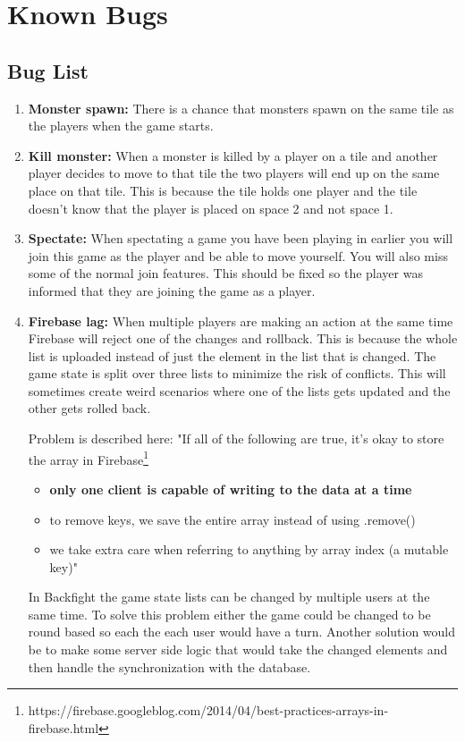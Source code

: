 \pagestyle{Uni}

\chapter{Known Bugs}

\section{Bug List}

\begin{enumerate}
	\item \textbf{Monster spawn:} There is a chance that monsters spawn on the same tile as the players when the game starts.
	
	\item \textbf{Kill monster:} When a monster is killed by a player on a tile and another player decides to move to that tile the two players will end up on the same place on that tile. This is because the tile holds one player and the tile doesn't know that the player is placed on space 2 and not space 1.
		
	\item \textbf{Spectate:} When spectating a game you have been playing in earlier you will join this game as the player and be able to move yourself. You will also miss some of the normal join features. This should be fixed so the player was informed that they are joining the game as a player.

	\item \textbf{Firebase lag:} When multiple players are making an action at the same time Firebase will reject one of the changes and rollback. This is because the whole list is uploaded instead of just the element in the list that is changed. The game state is split over three lists to minimize the risk of conflicts. This will sometimes create weird scenarios where one of the lists gets updated and the other gets rolled back.
	
	Problem is described here: "If all of the following are true, it's okay to store the array in Firebase\footnote{https://firebase.googleblog.com/2014/04/best-practices-arrays-in-firebase.html}
	
	\begin{itemize}
		\item \textbf{only one client is capable of writing to the data at a time}
		\item to remove keys, we save the entire array instead of using .remove()
		\item we take extra care when referring to anything by array index (a mutable key)"
	\end{itemize}
	In Backfight the game state lists can be changed by multiple users at the same time. To solve this problem either the game could be changed to be round based so each the each user would have a turn. Another solution would be to make some server side logic that would take the changed elements and then handle the synchronization with the database.
	

\end{enumerate}
